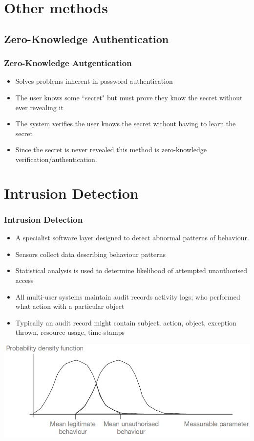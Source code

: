 \documentclass{beamer}
\begin{document}
\section{Other methods}
\subsection{Zero-Knowledge Authentication}
\begin{frame}
\frametitle{Zero-Knowledge Autgentication}
\begin{itemize}
\item Solves problems inherent in password authentication
\item The user knows some ``secret" but must prove they know the secret without ever revealing it
\item The system verifies the user knows the secret without having to learn the secret
\item Since the secret is never revealed this method is zero-knowledge verification/authentication.
\end{itemize}
\end{frame}
\section{Intrusion Detection}
\begin{frame}
\frametitle{Intrusion Detection}
\begin{itemize}
\item A specialist software layer designed to detect abnormal patterns of behaviour.
\item Sensors collect data describing behaviour patterns
\item Statistical analysis is used to determine likelihood of attempted unauthorised access
\item All multi-user systems maintain audit records activity logs; who performed what action with a particular object
\item Typically an audit record might contain subject, action, object, exception thrown, resource usage, time-stamps
\end{itemize}
\includegraphics[scale=0.35]{id.png}
\end{frame}
\end{document}
